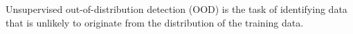 Unsupervised out-of-distribution detection (OOD) is the task of identifying data that is unlikely to originate from the distribution of the training data. 









